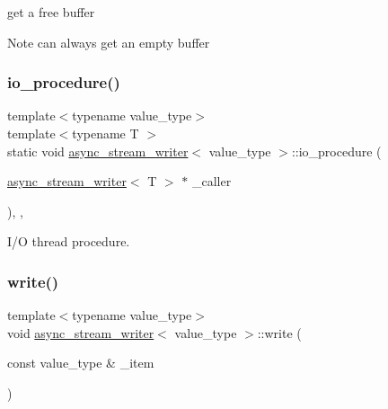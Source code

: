 get a free buffer 

\begin{DoxyNote}{Note}
can always get an empty buffer 
\end{DoxyNote}
\mbox{\label{classasync__stream__writer_a5fcc9c840654d18ba14668e43a3a0f31}} 
\subsubsection{\texorpdfstring{io\+\_\+procedure()}{io\_procedure()}}
{\footnotesize\ttfamily template$<$typename value\+\_\+type$>$ \\
template$<$typename T $>$ \\
static void \hyperlink{classasync__stream__writer}{async\+\_\+stream\+\_\+writer}$<$ value\+\_\+type $>$\+::io\+\_\+procedure (\begin{DoxyParamCaption}\item[{\hyperlink{classasync__stream__writer}{async\+\_\+stream\+\_\+writer}$<$ T $>$ $\ast$}]{\+\_\+caller }\end{DoxyParamCaption})\hspace{0.3cm}{\ttfamily [inline]}, {\ttfamily [static]}, {\ttfamily [private]}}



I/O thread procedure. 

\mbox{\label{classasync__stream__writer_afb36228f86866b4eb65343fd313754cc}} 
\subsubsection{\texorpdfstring{write()}{write()}\hspace{0.1cm}{\footnotesize\ttfamily [1/2]}}
{\footnotesize\ttfamily template$<$typename value\+\_\+type$>$ \\
void \hyperlink{classasync__stream__writer}{async\+\_\+stream\+\_\+writer}$<$ value\+\_\+type $>$\+::write (\begin{DoxyParamCaption}\item[{const value\+\_\+type \&}]{\+\_\+item }\end{DoxyParamCaption})\hspace{0.3cm}{\ttfamily [inline]}}



